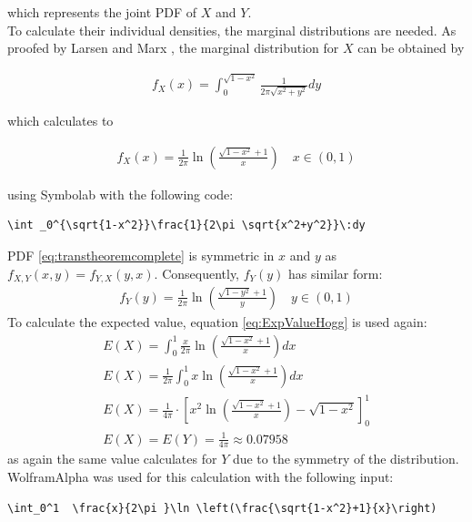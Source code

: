 which represents the joint PDF of $X$ and $Y$.\\
To calculate their individual densities, the marginal distributions are needed. As proofed by Larsen and Marx \cite[Theorem~3.7.2]{larsen2005introduction}, the marginal distribution for $X$ can be obtained by 

\begin{equation}
\begin{split}
f_{X}(x) = \int_{0}^{\sqrt{1-x^2}}\frac{1}{2\pi\sqrt{x^2+y^2}} dy
\end{split}
\label{eq:marginalX}
\end{equation}

which calculates to 

\begin{equation}
\begin{split}
f_{X}(x) = \frac{1}{2\pi }\ln \left(\frac{\sqrt{1-x^2}+1}{x}\right) \quad x \in (0,1)
\end{split}
\label{eq:marginalXcalculated}
\end{equation}

using Symbolab \cite{symbolab} with the following code:
\begin{lstlisting}
\int _0^{\sqrt{1-x^2}}\frac{1}{2\pi \sqrt{x^2+y^2}}\:dy
\end{lstlisting}

PDF \eqref{eq:transtheoremcomplete} is symmetric in $x$ and $y$ as $f_{X,Y}(x,y) = f_{Y,X}(y,x)$. Consequently, $f_Y(y)$ has similar form:
\begin{equation}
\begin{split}
f_{Y}(y) = \frac{1}{2\pi }\ln\left(\frac{\sqrt{1-y^2}+1}{y}\right) \quad y \in (0,1)
\end{split}
\label{eq:marginalYcalculated}
\end{equation}
To calculate the expected value, equation \eqref{eq:ExpValueHogg} is used again:
\begin{equation}
\begin{split}
E(X) = \int_0^1  \frac{x}{2\pi }\ln \left(\frac{\sqrt{1-x^2}+1}{x}\right) dx\\
E(X) = \frac{1}{2\pi}\int_0^1  x\ln \left(\frac{\sqrt{1-x^2}+1}{x}\right) dx\\
E(X) = \frac{1}{4\pi } \cdot \left[x^2\ln \left(\frac{\sqrt{1-x^2}+1}{x}\right)-\sqrt{1-x^2}\right]_0^1\\
E(X) = E(Y) = \frac{1}{4\pi} \approx 0.07958
\end{split}
\label{eq:expvalF_X}
\end{equation}
as again the same value calculates for $Y$ due to the symmetry of the distribution.
WolframAlpha \cite{wolfalph} was used for this calculation with the following input:
\begin{lstlisting}
\int_0^1  \frac{x}{2\pi }\ln \left(\frac{\sqrt{1-x^2}+1}{x}\right)
\end{lstlisting}

